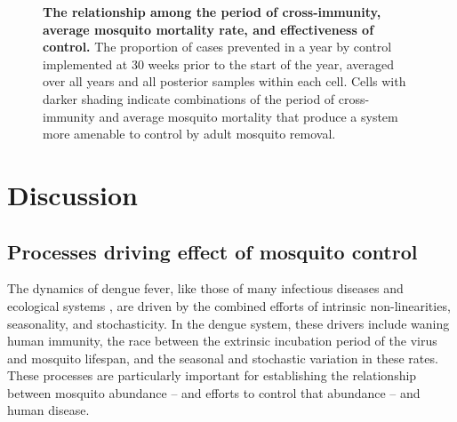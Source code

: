 \documentclass[10pt,letterpaper]{article}
\begin{document}
\begin{figure}[!h]
\caption{{\bf The relationship among the period of cross-immunity, average mosquito mortality rate, and effectiveness of control.}
The proportion of cases prevented in a year by control implemented at 30 weeks prior to the start of the year, averaged over all years and all posterior samples within each cell. Cells with darker shading indicate combinations of the period of cross-immunity and average mosquito mortality that produce a system more amenable to control by adult mosquito removal.
}
\label{immunity}
\end{figure}

\section*{Discussion}

\subsection*{Processes driving effect of mosquito control}

The dynamics of dengue fever, like those of many infectious diseases \cite{Ellner1998,Koelle2004} and ecological systems \cite{Bjornstad2001}, are driven by the combined efforts of intrinsic non-linearities, seasonality, and stochasticity.
In the dengue system, these drivers include waning human immunity, the race between the extrinsic incubation period of the virus and mosquito lifespan, and the seasonal and stochastic variation in these rates.
These processes are particularly important for establishing the relationship between mosquito abundance -- and efforts to control that abundance -- and human disease.
\end{document}
